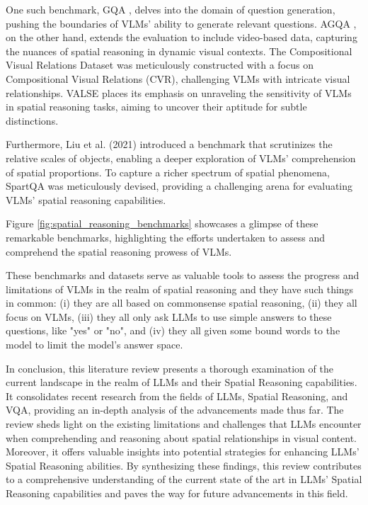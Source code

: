 \documentclass[journal,10pt]{IEEEtran}
\begin{document}
One such benchmark, GQA \cite{hudson2019gqa}, delves into the domain of question generation, pushing the boundaries of VLMs' ability to generate relevant questions. AGQA \cite{grunde2021agqa}, on the other hand, extends the evaluation to include video-based data, capturing the nuances of spatial reasoning in dynamic visual contexts. The Compositional Visual Relations Dataset \cite{zerroug2022benchmark} was meticulously constructed with a focus on Compositional Visual Relations (CVR), challenging VLMs with intricate visual relationships. VALSE \cite{parcalabescu2021valse} places its emphasis on unraveling the sensitivity of VLMs in spatial reasoning tasks, aiming to uncover their aptitude for subtle distinctions.

Furthermore, Liu et al. (2021) introduced a benchmark \cite{liu2022things} that scrutinizes the relative scales of objects, enabling a deeper exploration of VLMs' comprehension of spatial proportions. To capture a richer spectrum of spatial phenomena, SpartQA \cite{mirzaee2021spartqa} was meticulously devised, providing a challenging arena for evaluating VLMs' spatial reasoning capabilities.

Figure \ref{fig:spatial_reasoning_benchmarks} showcases a glimpse of these remarkable benchmarks, highlighting the efforts undertaken to assess and comprehend the spatial reasoning prowess of VLMs.


These benchmarks and datasets serve as valuable tools to assess the progress and limitations of VLMs in the realm of spatial reasoning and they have such things in common: (i) they are all based on commonsense spatial reasoning, (ii) they all focus on VLMs, (iii) they all only ask LLMs to use simple answers to these questions, like "yes" or "no", and (iv) they all given some bound words to the model to limit the model's answer space.

In conclusion, this literature review presents a thorough examination of the current landscape in the realm of LLMs and their Spatial Reasoning capabilities. It consolidates recent research from the fields of LLMs, Spatial Reasoning, and VQA, providing an in-depth analysis of the advancements made thus far. The review sheds light on the existing limitations and challenges that LLMs encounter when comprehending and reasoning about spatial relationships in visual content. Moreover, it offers valuable insights into potential strategies for enhancing LLMs' Spatial Reasoning abilities. By synthesizing these findings, this review contributes to a comprehensive understanding of the current state of the art in LLMs' Spatial Reasoning capabilities and paves the way for future advancements in this field.
\end{document}
